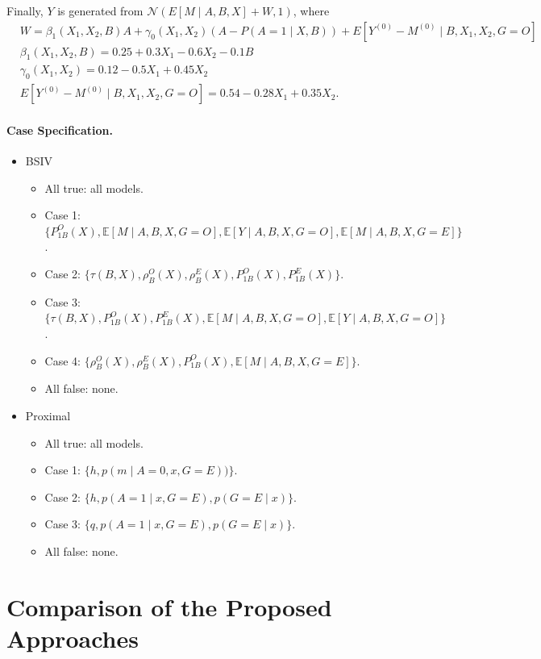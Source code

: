 \documentclass[10pt]{article}
\begin{document}
Finally, $Y$ is generated from $\mathcal{N}(E[M\mid A,B,X]+W,1)$, where
\begin{align*}
    &W=\beta_1(X_1,X_2,B)A+\gamma_0(X_1,X_2)(A-P(A=1\mid X,B))+E[Y^{(0)}-M^{(0)}\mid B,X_1,X_2,G=O]\\
    &\beta_1(X_1,X_2,B)=0.25+0.3X_1-0.6X_2-0.1B\\
    &\gamma_0(X_1,X_2)=0.12-0.5X_1+0.45X_2\\
    &E[Y^{(0)}-M^{(0)}\mid B,X_1,X_2,G=O]=0.54-0.28X_1+0.35X_2.
\end{align*}




\paragraph{Case Specification.}
\begin{itemize}
    \item BSIV
    \begin{itemize}
        \item All true: all models.
        \item Case 1: $\{P_{1B}^O(X),\mathbb{E}[M\mid A,B,X,G=O],\mathbb{E}[Y\mid A,B,X,G=O],\mathbb{E}[M\mid A,B,X,G=E]\}$.
        \item Case 2: $\{\tau(B,X),\rho_B^O(X),\rho_B^E(X),P_{1B}^O(X),P_{1B}^E(X)\}$.
        \item Case 3: $\{\tau(B,X),P_{1B}^O(X),P_{1B}^E(X),\mathbb{E}[M\mid A,B,X,G=O],\mathbb{E}[Y\mid A,B,X,G=O]\}$.
        \item Case 4: $\{\rho_B^O(X),\rho_B^E(X),P_{1B}^O(X),\mathbb{E}[M\mid A,B,X,G=E]\}$.
        \item All false: none.
    \end{itemize}
    \item Proximal
    \begin{itemize}
        \item All true: all models.
        \item Case 1: $\{h,p(m\mid A=0,x,G=E))\}$.
        \item Case 2: $\{h,p(A=1\mid x,G=E),p(G=E\mid x)\}$.
        \item Case 3: $\{q,p(A=1\mid x,G=E),p(G=E\mid x)\}$.
        \item All false: none.
    \end{itemize}
\end{itemize}

\section{Comparison of the Proposed Approaches}
\label{sec:summary::supp}
\end{document}
